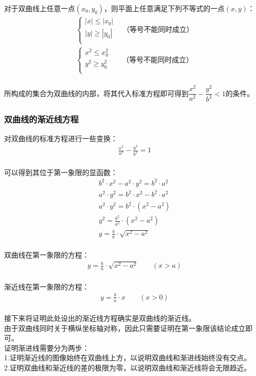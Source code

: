 \documentclass[UTF8]{ctexart}
\begin{document}
    对于双曲线上任意一点$(x_0,y_0)$，则平面上任意满足下列不等式的一点$(x,y)$：\vspace{5pt}
    \setcounter{equation}{0}
    \begin{align}
        &\begin{cases}
            |x|\leq|x_0|\\[1mm]
            |y|\geq|y_0|\\[1mm]
        \end{cases}~~~~\text{（等号不能同时成立）}\\[6mm]
        &\begin{cases}
            x^2\leq x_0^2\\[1mm]
            y^2\geq y_0^2\\[1mm]
        \end{cases}~~~~~~~\text{（等号不能同时成立）}
    \end{align}\\
    所构成的集合为双曲线的内部，将其代入标准方程即可得到$\dfrac{x^2}{a^2}-\dfrac{y^2}{b^2}<1$的条件。

\newpage

\subsubsection{双曲线的渐近线方程}
    对双曲线的标准方程进行一些变换：
    \setcounter{equation}{0}
    \begin{align}
        &\frac{x^2}{a^2}-\frac{y^2}{b^2}=1
    \end{align}\\
    可以得到其位于第一象限的显函数：\vspace{3pt}
    \begin{align}
        &b^2\cdot x^2-a^2\cdot y^2=b^2\cdot a^2\\[5mm]
        &a^2\cdot y^2=b^2\cdot x^2-b^2\cdot a^2\\[5mm]
        &a^2\cdot y^2=b^2\cdot \left(x^2-a^2\right)\\[5mm]
        &y^2=\frac{b^2}{a^2}\cdot \left(x^2-a^2\right)\\[5mm]
        &y=\frac{b}{a}\cdot \sqrt{x^2-a^2}
    \end{align}\\
    双曲线在第一象限的方程：
    \begin{align}
        &y=\frac{b}{a}\cdot \sqrt{x^2-a^2}\qquad(x>a)
    \end{align}\\
    渐近线在第一象限的方程：
    \begin{align}
        &y=\frac{b}{a}\cdot x\qquad(x>0)    
    \end{align}\\
    接下来将证明此处设出的渐近线方程确实是双曲线的渐近线。\\[3mm]
    由于双曲线同时关于横纵坐标轴对称，因此只需要证明在第一象限该结论成立即可。\\[15mm]
    证明渐进线需要分为两步：\\[3mm]
    1.证明渐近线的图像始终在双曲线上方，以说明双曲线和渐进线始终没有交点。\\[3mm]
    2.证明双曲线和渐近线的差的极限为零，以说明双曲线和渐近线将会无限趋近。
    
\end{document}
